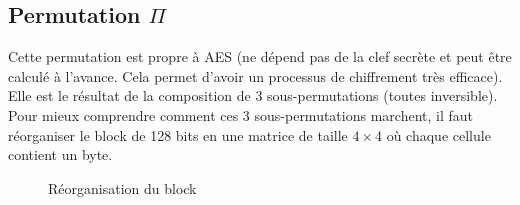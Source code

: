 \documentclass[a4paper, 12pt]{article}
\begin{document}
\subsection{Permutation $\Pi$}
Cette permutation est propre à AES (ne dépend pas de la clef secrète et peut être calculé à l'avance. Cela permet d'avoir un processus de chiffrement très efficace). Elle est le résultat de la composition de 3 sous-permutations (toutes inversible). Pour mieux comprendre comment ces 3 sous-permutations marchent, il faut réorganiser le block de 128 bits en une matrice de taille $4\times4$ où chaque cellule contient un byte.

\begin{figure}[h]
\centering
{}
\caption{Réorganisation du block}
\label{reorg_entre}
\end{figure}
\end{document}
